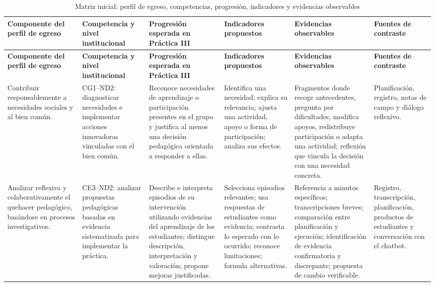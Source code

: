 \documentclass[11pt,a4paper]{article}
\begin{document}
\begin{landscape}
\small
\begin{longtable}{p{3.0cm}p{3.0cm}p{4.2cm}p{4.2cm}p{5.0cm}p{3.2cm}}
\caption{Matriz inicial: perfil de egreso, competencias, progresión, indicadores y evidencias observables}\\
\toprule
\textbf{Componente del perfil de egreso} &
\textbf{Competencia y nivel institucional} &
\textbf{Progresión esperada en Práctica III} &
\textbf{Indicadores propuestos} &
\textbf{Evidencias observables} &
\textbf{Fuentes de contraste}\\
\midrule
\endfirsthead

\toprule
\textbf{Componente del perfil de egreso} &
\textbf{Competencia y nivel institucional} &
\textbf{Progresión esperada en Práctica III} &
\textbf{Indicadores propuestos} &
\textbf{Evidencias observables} &
\textbf{Fuentes de contraste}\\
\midrule
\endhead

Contribuir responsablemente a necesidades sociales y al bien común. &
CG1--ND2: diagnosticar necesidades e implementar acciones innovadoras vinculadas con el bien común. &
Reconoce necesidades de aprendizaje o participación presentes en el grupo y justifica al menos una decisión pedagógica orientada a responder a ellas. &
Identifica una necesidad; explica su relevancia; ajusta una actividad, apoyo o forma de participación; analiza sus efectos. &
Fragmentos donde recoge antecedentes, pregunta por dificultades, modifica apoyos, redistribuye participación o adapta una actividad; reflexión que vincula la decisión con una necesidad concreta. &
Planificación, registro, notas de campo y diálogo reflexivo.\\
\midrule

Analizar reflexiva y colaborativamente el quehacer pedagógico, basándose en procesos investigativos. &
CE3--ND2: analizar propuestas pedagógicas basadas en evidencia sistematizada para implementar la práctica. &
Describe e interpreta episodios de su intervención utilizando evidencias del aprendizaje de los estudiantes; distingue descripción, interpretación y valoración; propone mejoras justificadas. &
Selecciona episodios relevantes; usa respuestas de estudiantes como evidencia; contrasta lo esperado con lo ocurrido; reconoce limitaciones; formula alternativas. &
Referencia a minutos específicos; transcripciones breves; comparación entre planificación y ejecución; identificación de evidencia confirmatoria y discrepante; propuesta de cambio verificable. &
Registro, transcripción, planificación, productos de estudiantes y conversación con el chatbot.\\
\midrule


\end{longtable}
\end{landscape}
\end{document}
